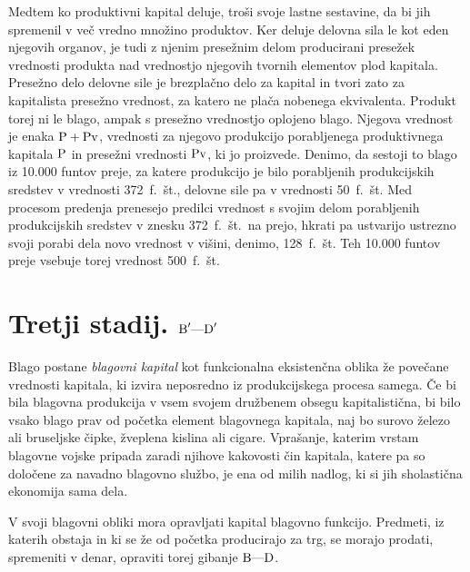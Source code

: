 \documentclass[kapital_02.tex]{subfiles}
\begin{document}
Medtem ko produktivni kapital deluje, troši svoje lastne sestavine, da bi jih spremenil v več vredno množino produktov. Ker deluje delovna sila le kot eden njegovih organov, je tudi z njenim presežnim delom producirani presežek vrednosti produkta nad vrednostjo njegovih tvornih elementov plod kapitala. Presežno delo delovne sile je brezplačno delo za kapital in tvori zato za kapitalista presežno vrednost, za katero ne plača nobenega ekvivalenta. Produkt torej ni le blago, ampak s presežno vrednostjo oplojeno blago. Njegova vrednost je enaka \( \textrm{P} + \textrm{Pv} \), vrednosti za njegovo produkcijo porabljenega produktivnega kapitala \( \textrm{P} \) in presežni vrednosti \( \textrm{Pv} \), ki jo proizvede. Denimo, da sestoji to blago iz 10.000 funtov preje, za katere produkcijo je bilo porabljenih produkcijskih sredstev v vrednosti 372~f.~št., delovne sile pa v vrednosti 50~f.~št. Med procesom predenja prenesejo predilci vrednost s svojim delom porabljenih produkcijskih sredstev v znesku 372~f.~št.\ na prejo, hkrati pa ustvarijo ustrezno svoji porabi dela novo vrednost v višini, denimo, 128~f.~št. Teh 10.000 funtov preje vsebuje torej vrednost 500~f.~št.

\section{Tretji stadij. \( \textrm{B}'\textrm{---}\textrm{D}' \)}

Blago postane \emph{blagovni kapital} kot funkcionalna eksistenčna oblika že povečane vrednosti kapitala, ki izvira neposredno iz produkcijskega procesa samega. Če bi bila blagovna produkcija v vsem svojem družbenem obsegu kapitalistična, bi bilo vsako blago prav od početka element blagovnega kapitala, naj bo surovo železo ali bruseljske čipke, žveplena kislina ali cigare. Vprašanje, katerim vrstam blagovne vojske pripada zaradi njihove kakovosti čin kapitala, katere pa so določene za navadno blagovno službo, je ena od milih nadlog, ki si jih sholastična ekonomija sama dela.

V svoji blagovni obliki mora opravljati kapital blagovno funkcijo. Predmeti, iz katerih obstaja in ki se že od početka producirajo za trg, se morajo prodati, spremeniti v denar, opraviti torej gibanje \( \textrm{B}\textrm{---}\textrm{D} \).
\end{document}

